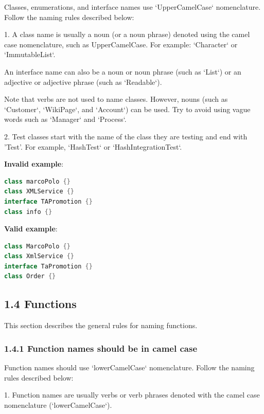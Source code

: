 Classes, enumerations, and interface names use `UpperCamelCase` nomenclature. Follow the naming rules described below:

1.	A class name is usually a noun (or a noun phrase) denoted using the camel case nomenclature, such as UpperCamelCase. For example: `Character` or `ImmutableList`.

An interface name can also be a noun or noun phrase (such as `List`) or an adjective or adjective phrase (such as `Readable`).

Note that verbs are not used to name classes. However, nouns (such as `Customer`, `WikiPage`, and `Account`) can be used. Try to avoid using vague words such as `Manager` and `Process`.



2.	Test classes start with the name of the class they are testing and end with 'Test'. For example, `HashTest` or `HashIntegrationTest`.



\textbf{Invalid example}: 

\begin{lstlisting}[language=Kotlin]
class marcoPolo {} 
class XMLService {} 
interface TAPromotion {}
class info {}
\end{lstlisting}


\textbf{Valid example}: 

\begin{lstlisting}[language=Kotlin]
class MarcoPolo {}
class XmlService {}
interface TaPromotion {}
class Order {}
\end{lstlisting}


\subsection*{\textbf{1.4 Functions}}

This section describes the general rules for naming functions.

\subsubsection*{\textbf{1.4.1 Function names should be in camel case}}
\leavevmode\newline

Function names should use `lowerCamelCase` nomenclature. Follow the naming rules described below:

1.	Function names are usually verbs or verb phrases denoted with the camel case nomenclature (`lowerCamelCase`).

